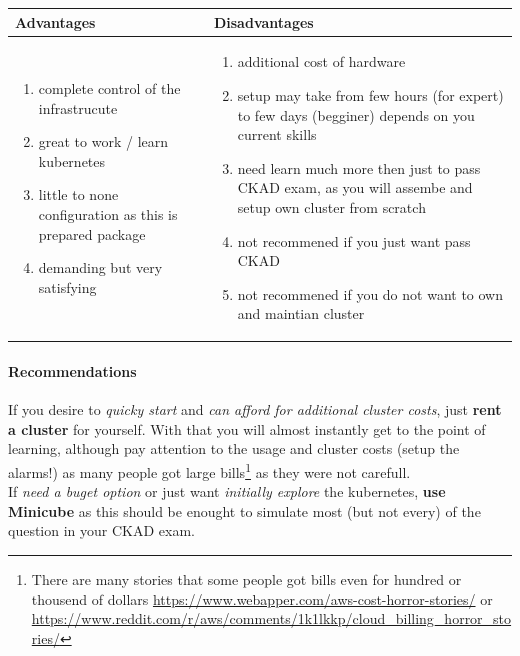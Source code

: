 \begin{tabularx}{\textwidth}{|X|X|}
	\hline
	\textbf{Advantages} & \textbf{Disadvantages} \\
	\hline
	\begin{enumerate}
		\item complete control of the infrastrucute
		\item great to work / learn kubernetes
		\item little to none configuration as this is prepared package
		\item demanding but very satisfying 
	\end{enumerate}
	
	&
	
	\begin{enumerate}
		\item additional cost of hardware
		\item setup may take from few hours (for expert) to few days (begginer) depends on you current skills
		\item need learn much more then just to pass CKAD exam, as you will assembe and setup own cluster from scratch
		\item not recommened if you just want pass CKAD
		\item not recommened if you do not want to own and maintian cluster
	\end{enumerate}\\
	\hline
\end{tabularx}

\paragraph{Recommendations} If you desire to \textit{quicky start} and \textit{can afford for additional cluster costs}, just \textbf{rent a cluster} for yourself. With that you will almost instantly get to the point of learning, although pay attention to the usage and cluster costs (setup the alarms!) as many people got large bills\footnote{There are many stories that some people got bills even for hundred or thousend of dollars \url{https://www.webapper.com/aws-cost-horror-stories/} or \url{https://www.reddit.com/r/aws/comments/1k1lkkp/cloud_billing_horror_stories/}} as they were not carefull.\\

If \textit{need a buget option} or just want \textit{initially explore} the kubernetes, \textbf{use Minicube}\cite{minikube-docs} as this should be enought to simulate most (but not every) of the question in your CKAD exam.\\

